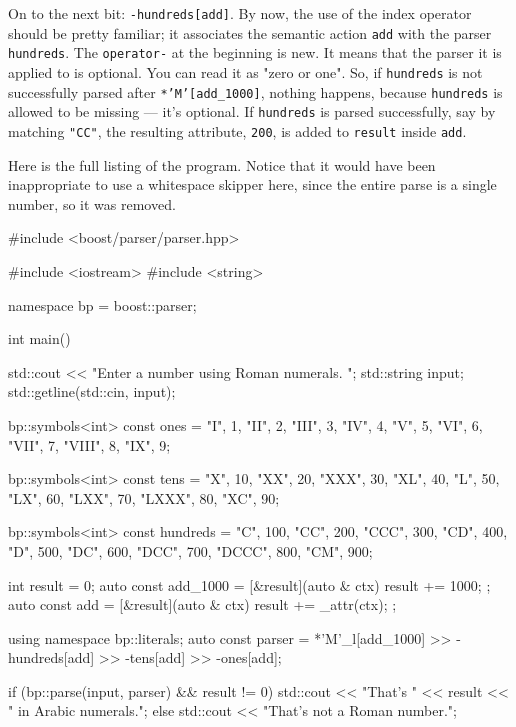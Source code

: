 On to the next bit: \texttt{-hundreds{[}add{]}}. By now, the use of the index operator should be pretty familiar; it associates the semantic action \texttt{add} with the parser \texttt{hundreds}. The \texttt{operator-} at the beginning is new. It means that the parser it is applied to is optional. You can read it as "zero or one". So, if \texttt{hundreds} is not successfully parsed after \texttt{*'M'{[}add\_1000{]}}, nothing happens, because \texttt{hundreds} is allowed to be missing --- it's optional. If \texttt{hundreds} is parsed successfully, say by matching \texttt{"CC"}, the resulting attribute, \texttt{200}, is added to \texttt{result} inside \texttt{add}.

Here is the full listing of the program. Notice that it would have been inappropriate to use a whitespace skipper here, since the entire parse is a single number, so it was removed.

\begin{code}
#include <boost/parser/parser.hpp>

#include <iostream>
#include <string>


namespace bp = boost::parser;

int main()
{
    std::cout << "Enter a number using Roman numerals. ";
    std::string input;
    std::getline(std::cin, input);

    bp::symbols<int> const ones = {
        {"I", 1},
        {"II", 2},
        {"III", 3},
        {"IV", 4},
        {"V", 5},
        {"VI", 6},
        {"VII", 7},
        {"VIII", 8},
        {"IX", 9}};

    bp::symbols<int> const tens = {
        {"X", 10},
        {"XX", 20},
        {"XXX", 30},
        {"XL", 40},
        {"L", 50},
        {"LX", 60},
        {"LXX", 70},
        {"LXXX", 80},
        {"XC", 90}};

    bp::symbols<int> const hundreds = {
        {"C", 100},
        {"CC", 200},
        {"CCC", 300},
        {"CD", 400},
        {"D", 500},
        {"DC", 600},
        {"DCC", 700},
        {"DCCC", 800},
        {"CM", 900}};

    int result = 0;
    auto const add_1000 = [&result](auto & ctx) { result += 1000; };
    auto const add = [&result](auto & ctx) { result += _attr(ctx); };

    using namespace bp::literals;
    auto const parser =
        *'M'_l[add_1000] >> -hundreds[add] >> -tens[add] >> -ones[add];

    if (bp::parse(input, parser) && result != 0)
        std::cout << "That's " << result << " in Arabic numerals.\n";
    else
        std::cout << "That's not a Roman number.\n";
}
\end{code}


